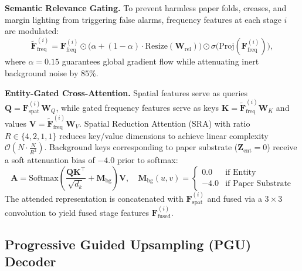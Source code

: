 \noindent\textbf{Semantic Relevance Gating.}
To prevent harmless paper folds, creases, and margin lighting from triggering false alarms, frequency features at each stage $i$ are modulated:
\begin{equation}
    \tilde{\mathbf{F}}_{\text{freq}}^{(i)} = \mathbf{F}_{\text{freq}}^{(i)} \odot \Big(\alpha + (1 - \alpha) \cdot \text{Resize}(\mathbf{W}_{\text{rel}})\Big) \odot \sigma\Big(\text{Proj}(\mathbf{F}_{\text{freq}}^{(i)})\Big),
\end{equation}
where $\alpha = 0.15$ guarantees global gradient flow while attenuating inert background noise by $85\%$.

\noindent\textbf{Entity-Gated Cross-Attention.}
Spatial features serve as queries $\mathbf{Q} = \mathbf{F}_{\text{spat}}^{(i)} \mathbf{W}_Q$, while gated frequency features serve as keys $\mathbf{K} = \tilde{\mathbf{F}}_{\text{freq}}^{(i)} \mathbf{W}_K$ and values $\mathbf{V} = \tilde{\mathbf{F}}_{\text{freq}}^{(i)} \mathbf{W}_V$. Spatial Reduction Attention (SRA) with ratio $R \in \{4, 2, 1, 1\}$ reduces key/value dimensions to achieve linear complexity $\mathcal{O}(N \cdot \frac{N}{R^2})$. Background keys corresponding to paper substrate ($\mathbf{Z}_{\text{ent}} = 0$) receive a soft attenuation bias of $-4.0$ prior to softmax:
\begin{equation}
    \mathbf{A} = \text{Softmax}\left( \frac{\mathbf{Q} \mathbf{K}^\top}{\sqrt{d_k}} + \mathbf{M}_{\text{bg}} \right) \mathbf{V}, \quad \mathbf{M}_{\text{bg}}(u, v) = \begin{cases} 0.0 & \text{if Entity} \\ -4.0 & \text{if Paper Substrate} \end{cases}
\end{equation}
The attended representation is concatenated with $\mathbf{F}_{\text{spat}}^{(i)}$ and fused via a $3 \times 3$ convolution to yield fused stage features $\mathbf{F}_{\text{fused}}^{(i)}$.

\subsection{Progressive Guided Upsampling (PGU) Decoder}
\label{subsec:pgu_decoder}

